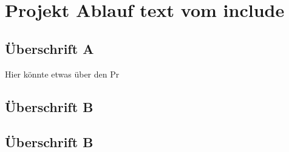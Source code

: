 \chapter{Projekt Ablauf text vom include}


\section{Überschrift A}
Hier könnte etwas über den Pr\\


\newpage
\section{Überschrift B}



\section{Überschrift B}
